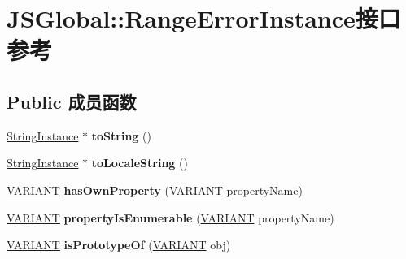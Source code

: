 \hypertarget{interface_j_s_global_1_1_range_error_instance}{}\section{J\+S\+Global\+:\+:Range\+Error\+Instance接口 参考}
\label{interface_j_s_global_1_1_range_error_instance}
\subsection*{Public 成员函数}
\begin{DoxyCompactItemize}
\item 
\mbox{\label{interface_j_s_global_1_1_range_error_instance_ab8935554e3741954859dd5091352b66f}} 
\hyperlink{interface_j_s_global_1_1_string_instance}{String\+Instance} $\ast$ {\bfseries to\+String} ()
\item 
\mbox{\label{interface_j_s_global_1_1_range_error_instance_a3512a125f92cee6aa31943d3fd9f30c7}} 
\hyperlink{interface_j_s_global_1_1_string_instance}{String\+Instance} $\ast$ {\bfseries to\+Locale\+String} ()
\item 
\mbox{\label{interface_j_s_global_1_1_range_error_instance_a400855f096f0d277267586735ca05d3e}} 
\hyperlink{structtag_v_a_r_i_a_n_t}{V\+A\+R\+I\+A\+NT} {\bfseries has\+Own\+Property} (\hyperlink{structtag_v_a_r_i_a_n_t}{V\+A\+R\+I\+A\+NT} property\+Name)
\item 
\mbox{\label{interface_j_s_global_1_1_range_error_instance_a7efdd421812a4bb413f9467ca7907aeb}} 
\hyperlink{structtag_v_a_r_i_a_n_t}{V\+A\+R\+I\+A\+NT} {\bfseries property\+Is\+Enumerable} (\hyperlink{structtag_v_a_r_i_a_n_t}{V\+A\+R\+I\+A\+NT} property\+Name)
\item 
\mbox{\label{interface_j_s_global_1_1_range_error_instance_a3dda4a09047858d230b09554bf11152f}} 
\hyperlink{structtag_v_a_r_i_a_n_t}{V\+A\+R\+I\+A\+NT} {\bfseries is\+Prototype\+Of} (\hyperlink{structtag_v_a_r_i_a_n_t}{V\+A\+R\+I\+A\+NT} obj)
\end{DoxyCompactItemize}

